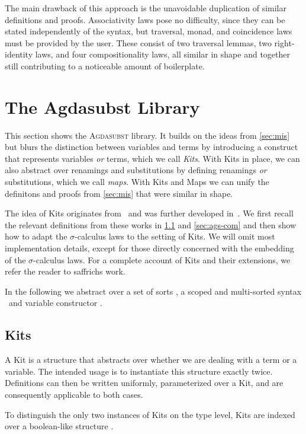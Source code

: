 \documentclass[screen,nonacm]{acmart}
\begin{document}
The main drawback of this approach is the unavoidable duplication of similar
definitions and proofs. Associativity laws pose no difficulty, since they can
be stated independently of the syntax, but traversal, monad, and coincidence
laws must be provided by the user. These consist of two traversal lemmas, two
right-identity laws, and four compositionality laws, all similar in shape and
together still contributing to a noticeable amount of boilerplate.

\section{The Agdasubst Library}\label{sec:ags}
This section shows the \textsc{Agdasubst} library. It builds on the ideas from
\cref{sec:mis} but blurs the distinction between variables and terms by
introducing a construct that represents variables \emph{or} terms, which we
call \emph{Kits}. With Kits in place, we can also abstract over renamings and
substitutions by defining renamings \emph{or} substitutions, which we call
\emph{maps}. With Kits and Maps we can unify the definitons and proofs from
\cref{sec:mis} that were similar in shape.

The idea of Kits originates from~\cite{...} and was further developed
in~\cite{...}. We first recall the relevant definitions from these works in
\cref{sec:ags-kit} and \cref{sec:ags-com} and then show how to adapt the
$\sigma$-calculus laws to the setting of Kits. We will omit most implementation
details, except for those directly concerned with the embedding of the
$\sigma$-calculus laws. For a complete account of Kits and their extensions, we
refer the reader to saffrichs work.

In the following we abstract over a set of sorts \ASortParam, a scoped and
multi-sorted syntax \AScopedT \ and variable constructor \AVarCstr.

\subsection{Kits}\label{sec:ags-kit}
A Kit is a structure that abstracts over whether we are dealing with a term or
a variable. The intended usage is to instantiate this structure exactly twice.
Definitions can then be written uniformly, parameterized over a Kit, and are
consequently applicable to both cases. \AKit

To distinguish the only two instances of Kits on the type level, Kits are
indexed over a boolean-like structure \AModeDef.
\end{document}
